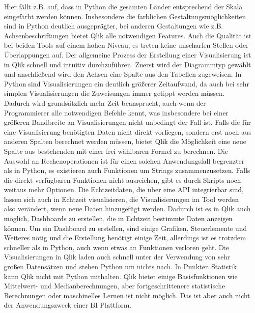 \documentclass[12pt]{article}
\begin{document}
	Hier fällt z.B. auf, dass in Python die gesamten Länder entsprechend der Skala eingefärbt werden können.
	Insbesondere die farblichen Gestaltungsmöglichkeiten sind in Python deutlich ausgeprägter, bei anderen Gestaltungen wie z.B. Achsenbeschriftungen bietet Qlik alle notwendigen Features. Auch die Qualität ist bei beiden Tools auf einem hohen Niveau, es treten keine unscharfen Stellen oder Überlappungen auf. Der allgemeine Prozess der Erstellung einer Visualisierung ist in Qlik schnell und intuitiv durchzuführen. Zuerst wird der Diagrammtyp gewählt und anschließend wird den Achsen eine Spalte aus den Tabellen zugeweisen. In Python sind Visualisierungen ein deutlich größerer Zeitaufwand, da auch bei sehr simplen Visualisierungen die Zuweisungen immer getippt werden müssen. Dadurch wird grundsätzlich mehr Zeit beansprucht, auch wenn der Programmierer alle notwendigen Befehle kennt, was insbesondere bei einer größeren Bandbreite an Visualisierungen nicht unbedingt der Fall ist. Falls die für eine Visualisierung benötigten Daten nicht direkt vorliegen, sondern erst noch aus anderen Spalten berechnet werden müssen, bietet Qlik die Möglichkeit eine neue Spalte aus bestehenden mit einer frei wählbaren Formel zu berechnen. Die Auswahl an Rechenoperationen ist für einen solchen Anwendungsfall begrenzter als in Python, es existieren auch Funktionen um Strings zusammenzusetzen. Falls die direkt verfügbaren Funktionen nicht ausreichen, gibt es durch Skripts noch weitaus mehr Optionen.
	Die Echtzeitdaten, die über eine API integrierbar sind, lassen sich auch in Echtzeit visualisieren, die Visualisierungen im Tool werden also verändert, wenn neue Daten hinzugefügt werden. Dadurch ist es in Qlik auch möglich, Dashboards zu erstellen, die in Echtzeit bestimmte Daten anzeigen können. Um ein Dashboard zu erstellen, sind einige Grafiken, Steuerlemente und Weiteres nötig und die Erstellung benötigt einige Zeit, allerdings ist es trotzdem schneller als in Python, auch wenn etwas an Funktionen verloren geht.
	Die Visualisierungen in Qlik laden auch schnell unter der Verwendung von sehr großen Datensätzen und stehen Python um nichts nach.
	In Punkten Statistik kann Qlik nicht mit Python mithalten. Qlik bietet einige Basisfunktionen wie Mittelwert- und Medianberechnungen, aber fortgeschrittenere statistische Berechnungen oder maschinelles Lernen ist nicht möglich. Das ist aber auch nicht der Anwendungszweck einer BI Plattform.
	
\end{document}
